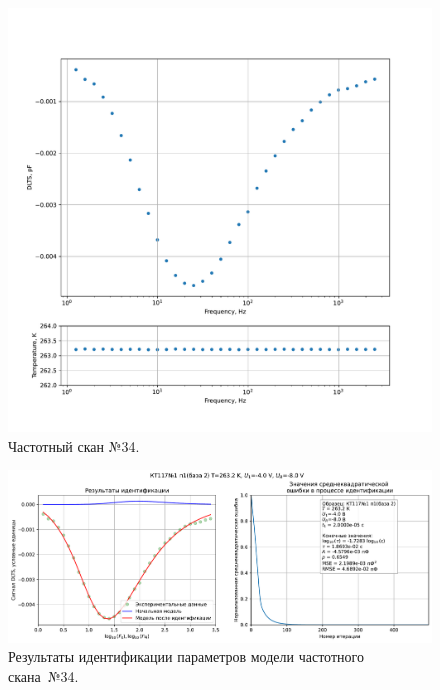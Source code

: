\begin{figure}[!ht]
    \centering
    \includegraphics[width=1\textwidth]{../plots/КТ117№1_п1(база 2)_2500Гц-1Гц_1пФ_-10С_-4В-8В_100мВ_20мкс_шаг_0,1.pdf}
    \caption{Частотный скан №34.}
    \label{pic:frequency_scan_34}
\end{figure}

\begin{figure}[!ht]
    \centering
    \includegraphics[width=1\textwidth]{../plots/КТ117№1_п1(база 2)_2500Гц-1Гц_1пФ_-10С_-4В-8В_100мВ_20мкс_шаг_0,1_model.pdf}
    \caption{Результаты идентификации параметров модели частотного скана~№34.}
    \label{pic:frequency_scan_model34}
\end{figure}

\pagebreak


